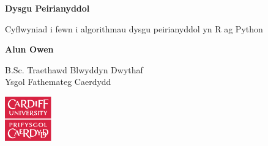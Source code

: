 \begin{titlepage}
    \begin{center}
        \vspace*{5cm}

        \textbf{Dysgu Peirianyddol}

        \vspace{0.5cm}
        Cyflwyniad i fewn i algorithmau dysgu peirianyddol yn R ag Python

        \vspace{1.5cm}

        \textbf{Alun Owen}

        \vfill

        B.Sc. Traethawd Blwyddyn Dwythaf\\

        \vspace{0.5cm}
        Ysgol Fathemateg Caerdydd

        \vspace{1.5cm}

        \includegraphics[width=0.15\textwidth]{../img/cflogo.pdf}


    \end{center}
\end{titlepage}